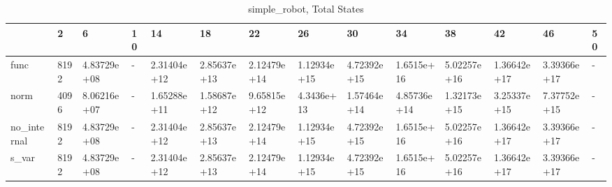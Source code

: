 \begin{table}
\caption{simple_robot, Total States}
\label{simple_robot_total}
\begin{tabular}{llllllllllllll}
\toprule
 & 2 & 6 & 10 & 14 & 18 & 22 & 26 & 30 & 34 & 38 & 42 & 46 & 50 \\
\midrule
func & 8192 & 4.83729e+08 & - & 2.31404e+12 & 2.85637e+13 & 2.12479e+14 & 1.12934e+15 & 4.72392e+15 & 1.6515e+16 & 5.02257e+16 & 1.36642e+17 & 3.39366e+17 & - \\
norm & 4096 & 8.06216e+07 & - & 1.65288e+11 & 1.58687e+12 & 9.65815e+12 & 4.3436e+13 & 1.57464e+14 & 4.85736e+14 & 1.32173e+15 & 3.25337e+15 & 7.37752e+15 & - \\
no_internal & 8192 & 4.83729e+08 & - & 2.31404e+12 & 2.85637e+13 & 2.12479e+14 & 1.12934e+15 & 4.72392e+15 & 1.6515e+16 & 5.02257e+16 & 1.36642e+17 & 3.39366e+17 & - \\
s_var & 8192 & 4.83729e+08 & - & 2.31404e+12 & 2.85637e+13 & 2.12479e+14 & 1.12934e+15 & 4.72392e+15 & 1.6515e+16 & 5.02257e+16 & 1.36642e+17 & 3.39366e+17 & - \\
\bottomrule
\end{tabular}
\end{table}
